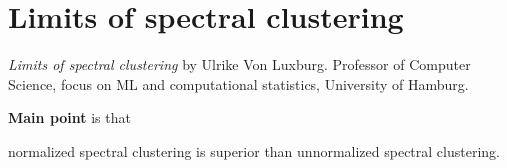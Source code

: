 \section{Limits of spectral clustering}
\label{ch:ulrike2004}

\textit{Limits of spectral clustering} by Ulrike Von Luxburg. Professor of Computer Science, focus on ML and computational statistics, University of Hamburg.
\newline

\textbf{Main point} is that \begin{inparaenum}
\item normalized spectral clustering is superior than unnormalized spectral clustering.
\end{inparaenum}

